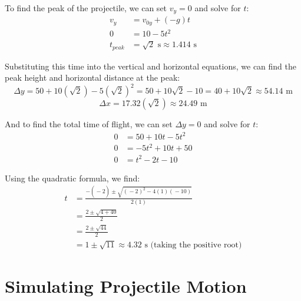To find the peak of the projectile, we can set $v_y = 0$ and solve for $t$:
\begin{align*}
    v_y &= v_{0y} + (-g) t \\
    0 &= 10 - 5t^2 \\
    t_{peak} &= \sqrt{2} \text{ s} \approx 1.414 \text{ s}
\end{align*}

Substituting this time into the vertical and horizontal equations, we can find the peak height and horizontal distance at the peak:
\[
\Delta y = 50 + 10(\sqrt{2}) - 5(\sqrt{2})^2 = 50 + 10\sqrt{2} - 10 = 40 + 10\sqrt{2} \approx 54.14 \text{ m}
\]
\[
\Delta x = 17.32(\sqrt{2}) \approx 24.49 \text{ m}
\]

And to find the total time of flight, we can set $\Delta y = 0$ and solve for $t$:
\begin{align*}
    0 &= 50 + 10t - 5t^2 \\
    0 &= -5t^2 + 10t + 50 \\
    0 &= t^2 - 2t - 10
\end{align*}

Using the quadratic formula, we find:
\begin{align*}
    t &= \frac{- \left(\right. - 2 \left.\right) \pm \sqrt{\left(\right. - 2 \left.\right)^{2} - 4 \left(\right. 1 \left.\right) \left(\right. - 10 \left.\right)}}{2 \left(\right. 1 \left.\right)} \\ 
    &= \frac{2 \pm \sqrt{4 + 40}}{2} \\
    &= \frac{2 \pm \sqrt{44}}{2} \\
    &= 1 \pm \sqrt{11} \approx 4.32 \text{ s (taking the positive root)}
\end{align*}

\section{Simulating Projectile Motion}



